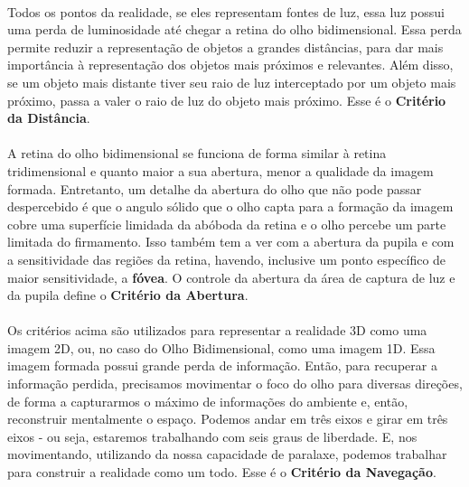 \documentclass{article}
\begin{document}
	\paragraph{}
	Todos os pontos da realidade, se eles representam fontes de luz, essa luz possui uma perda de luminosidade até chegar a retina do olho bidimensional. Essa perda permite reduzir a representação de objetos a grandes distâncias, para dar mais importância à representação dos objetos mais próximos e relevantes. Além disso, se um objeto mais distante tiver seu raio de luz interceptado por um objeto mais próximo, passa a valer o raio de luz do objeto mais próximo. Esse é o \textbf{Critério da Distância}.
	
	\paragraph{}
	A retina do olho bidimensional se funciona de forma similar à retina tridimensional e quanto maior a sua abertura, menor a qualidade da imagem formada. Entretanto, um detalhe da abertura do olho que não pode passar despercebido é que o angulo sólido que o olho capta para a formação da imagem cobre uma superfície limidada da abóboda da retina e o olho percebe um parte limitada do firmamento. Isso também tem a ver com a abertura da pupila e com a sensitividade das regiões da retina, havendo, inclusive um ponto específico de maior sensitividade, a \textbf{fóvea}. O controle da abertura da área de captura de luz e da pupila define o \textbf{Critério da Abertura}.
	
	\paragraph{}
	Os critérios acima são utilizados para representar a realidade 3D como uma imagem 2D, ou, no caso do Olho Bidimensional, como uma imagem 1D. Essa imagem formada possui grande perda de informação. Então, para recuperar a informação perdida, precisamos movimentar o foco do olho para diversas direções, de forma a capturarmos o máximo de informações do ambiente e, então, reconstruir mentalmente o espaço. Podemos andar em três eixos e girar em três eixos - ou seja, estaremos trabalhando com seis graus de liberdade. E, nos movimentando, utilizando da nossa capacidade de paralaxe, podemos trabalhar para construir a realidade como um todo. Esse é o \textbf{Critério da Navegação}.
	
\end{document}
